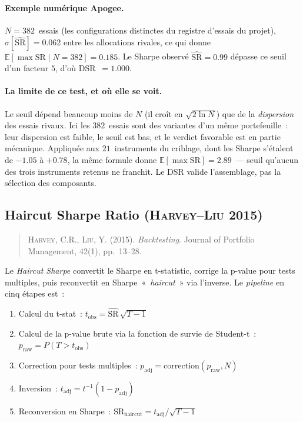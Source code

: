 \paragraph{Exemple numérique Apogee.} $N = 382$~essais (les configurations distinctes du registre d'essais du projet), $\widehat{\sigma}[\widehat{\mathrm{SR}}] = 0.062$ entre les allocations rivales, ce qui donne $\mathbb{E}[\max \mathrm{SR}\mid N = 382] = 0.185$. Le Sharpe observé $\widehat{\mathrm{SR}} = 0.99$ dépasse ce seuil d'un facteur $5$, d'où DSR~$= 1.000$.

\paragraph{La limite de ce test, et où elle se voit.} Le seuil dépend beaucoup moins de $N$ (il croît en $\sqrt{2\ln N}$) que de la \emph{dispersion} des essais rivaux. Ici les $382$~essais sont des variantes d'un même portefeuille~: leur dispersion est faible, le seuil est bas, et le verdict favorable est en partie mécanique. Appliquée aux $21$~instruments du criblage, dont les Sharpe s'étalent de $-1.05$ à $+0.78$, la même formule donne $\mathbb{E}[\max \mathrm{SR}] = 2.89$~--- seuil qu'aucun des trois instruments retenus ne franchit. Le DSR valide l'assemblage, pas la sélection des composants.

\subsection{Haircut Sharpe Ratio (\textsc{Harvey--Liu} 2015)}
\label{app:haircut}

\begin{quote}\small
\textsc{Harvey}, C.R., \textsc{Liu}, Y. (2015). \emph{Backtesting}. Journal of Portfolio Management, 42(1), pp.~13--28.
\end{quote}

Le \emph{Haircut Sharpe} convertit le Sharpe en t-statistic, corrige la p-value pour tests multiples, puis reconvertit en Sharpe~«~\textit{haircut}~» via l'inverse. Le \emph{pipeline} en cinq étapes est~:

\begin{enumerate}
\item Calcul du t-stat~: $t_{\text{obs}} = \widehat{\mathrm{SR}} \, \sqrt{T - 1}$
\item Calcul de la p-value brute via la fonction de survie de Student-t~:
      $p_{\text{raw}} = P(T > t_{\text{obs}})$
\item Correction pour tests multiples~: $p_{\text{adj}} = \mathrm{correction}(p_{\text{raw}}, N)$
\item Inversion~: $t_{\text{adj}} = t^{-1}(1 - p_{\text{adj}})$
\item Reconversion en Sharpe~: $\mathrm{SR}_{\text{haircut}} = t_{\text{adj}} / \sqrt{T - 1}$
\end{enumerate}

